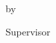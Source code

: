 \newpage
{}

{
\centering
\thesistitle
\tpbreak
by
\tpbreak
\nameanddegrees
\tpbreak
}

\newcommand\panelist[3]{\noindent #1, #2\\\noindent(#3)\tpbreak}
\vfill
\noindent Supervisor
\tpbreak
\panel
\vfill
\pagebreak

